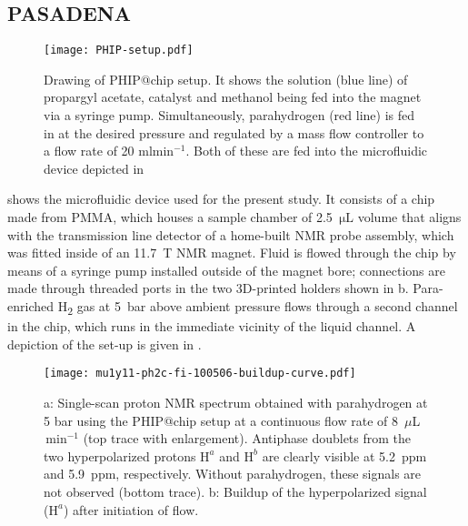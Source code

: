 \subsection{PASADENA}

\begin{figure}
  \begin{center}
  \texttt{[image: PHIP-setup.pdf]}
  \end{center}
  \caption{Drawing of PHIP@chip setup. It shows the solution (blue line)
  of propargyl acetate, catalyst and methanol being fed into the magnet
  via a syringe pump. Simultaneously, parahydrogen (red line) is fed in
  at the desired pressure and regulated by a mass flow controller to a
  flow rate of 20 ml$\text{min}^{-1}$. Both of these are fed into the
  microfluidic device depicted in }
  \label{fig:SetUp}
\end{figure}

 shows the microfluidic device used for the
present study. It consists of a chip made from PMMA, which houses a sample
chamber of 2.5~$\mathrm{\mu L}$ volume that aligns with the transmission line
detector of a home-built NMR probe assembly, which was fitted inside of an
11.7~T NMR magnet.
Fluid is flowed through the chip by means of a syringe pump
installed outside of the magnet bore; connections are made through threaded
ports in the two 3D-printed holders shown in b.
Para-enriched H\textsubscript{2} gas at 5~bar above ambient pressure flows
through a second
channel in the chip, which runs in
the immediate vicinity of the liquid channel. A depiction of the set-up is given in .


\begin{figure}
	\centering
	\texttt{[image: mu1y11-ph2c-fi-100506-buildup-curve.pdf]}
	\caption{a: Single-scan proton NMR spectrum obtained with
  parahydrogen at 5 bar using the PHIP@chip setup at a continuous
  flow rate of 8~$\mu$L$\,\text{min}^{-1}$ (top trace with enlargement).
  Antiphase doublets from the two
	hyperpolarized protons $\mathrm{H}^a$  and $\mathrm{H}^{b}$ are
  clearly visible at 5.2~ppm and 5.9~ppm, respectively. Without
  parahydrogen, these signals are not observed (bottom trace).
	b: Buildup of the hyperpolarized signal ($\mathrm{H}^{a}$)
  after initiation of flow.
	}
	\label{fig:phip@chip2}
\end{figure}


